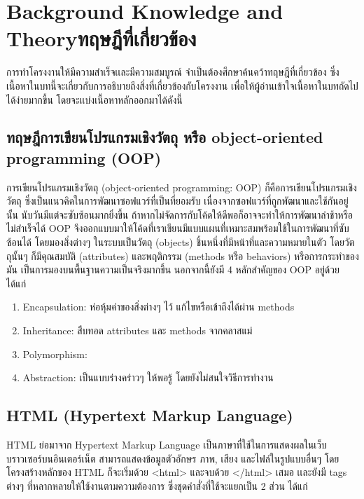 \chapter{\ifenglish Background Knowledge and Theory\else ทฤษฎีที่เกี่ยวข้อง\fi}

การทําโครงงานให้มีความสําเร็จเเละมีความสมบูรณ์ จําเป็นต้องศึกษาค้นคว้าทฤษฎีที่เกี่ยวข้อง ซึ่งเนื้อหาในบทนี้จะเกี่ยวกับการอธิบายถึงสิ่งที่เกี่ยวข้องกับโครงงาน เพื่อให้ผู้อ่านเข้าใจเนื้อหาในบทถัดไปได้ง่ายมากขึ้น โดยจะเเบ่งเนื้อหาหลักออกมาได้ดังนี้

\section{ทฤษฎีการเขียนโปรแกรมเชิงวัตถุ หรือ object-oriented programming (OOP)}

การเขียนโปรแกรมเชิงวัตถุ (object-oriented programming: OOP) ก็คือการเขียนโปรแกรมเชิงวัตถุ ซึ่งเป็นแนวคิดในการพัฒนาซอฟแวร์ที่เป็นที่ยอมรับ เนื่องจากซอฟแวร์ที่ถูกพัฒนาและใช้กันอยู่นั้น นับวันมีแต่จะซับซ้อนมากยิ่งขึ้น ถ้าหากไม่จัดการกับโค้ดให้ดีพอก็อาจจะทำให้การพัฒนาล่าช้าหรือไม่สำเร็จได้  OOP จึงออกแบบมาให้โค้ดที่เราเขียนมีแบบแผนที่เหมาะสมพร้อมใช้ในการพัฒนาที่ซับซ้อนได้ โดยมองสิ่งต่างๆ ในระบบเป็นวัตถุ (objects) ชิ้นหนึ่งที่มีหน้าที่และความหมายในตัว โดยวัตถุนั้นๆ ก็มีคุณสมบัติ (attributes) และพฤติกรรม (methods หรือ behaviors) หรือการกระทำของมัน เป็นการมองบนพื้นฐานความเป็นจริงมากขึ้น นอกจากนี้ยังมี 4 หลักสําคัญของ OOP อยู่ด้วย ได้แก่

\begin{enumerate}

\item Encapsulation: ห่อหุ้มค่าของสิ่งต่างๆ ไว้ แก้ไขหรือเข้าถึงได้ผ่าน methods
\item Inheritance: สืบทอด attributes และ methods จากคลาสแม่
\item Polymorphism: 
\item Abstraction: เป็นแบบร่างคร่าวๆ ให้พอรู้ โดยยังไม่สนใจวิธีการทำงาน
\end{enumerate}

\section{HTML (Hypertext Markup Language)}

HTML ย่อมาจาก Hypertext Markup Language เป็นภาษาที่ใช้ในการแสดงผลในเว็บบราวเซอร์บนอินเตอร์เน็ต สามารถแสดงข้อมูลตัวอักษร ภาพ, เสียง และไฟล์ในรูปแบบอื่นๆ โดยโครงสร้างหลักของ HTML ก็จะเริ่มด้วย <html> และจบด้วย </html> เสมอ เเละยังมี tags ต่างๆ ที่หลากหลายให้ใช้งานตามความต้องการ ซึ่งชุดคำสั่งที่ใช้จะแยกเป็น 2 ส่วน ได้แก่

